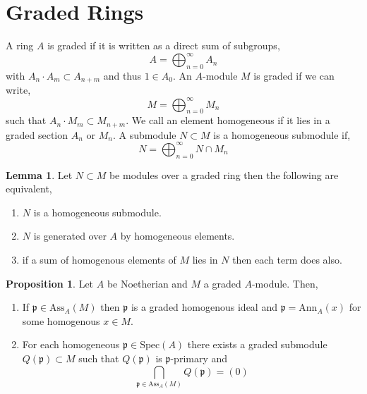 \documentclass[12pt]{article}
\newcommand{\Ann}[2]{\mathrm{Ann}_{#1}\left(#2\right)}
\newcommand{\Ass}[2]{\mathrm{Ass}_{#1}\left( #2 \right)}
\newcommand{\spec}[1]{\mathrm{Spec}\left( #1 \right)}
\newcommand{\p}{\mathfrak{p}}
\theoremstyle{remark}
\theoremstyle{definition}
\newtheorem{lemma}[theorem]{Lemma}
\newtheorem{proposition}[theorem]{Proposition}
\newenvironment{definition}[1][Definition:]{\begin{trivlist}
\item[\hskip \labelsep {\bfseries #1}]}{\end{trivlist}}
\begin{document}
\section{Graded Rings}

\begin{definition}
A ring $A$ is graded if it is written as a direct sum of subgroups,
\[ A = \bigoplus_{n = 0}^\infty A_n \]
with $A_n \cdot A_m \subset A_{n + m}$ and thus $1 \in A_0$. An $A$-module $M$ is graded if we can write,
\[ M = \bigoplus_{n = 0}^\infty M_n \]
such that $A_n \cdot M_m \subset M_{n + m}$. We call an element homogeneous if it lies in a graded section $A_n$ or $M_n$. A submodule $N \subset M$ is a homogeneous submodule if,
\[ N = \bigoplus_{n = 0}^\infty N \cap M_n \]
\end{definition}

\begin{lemma}
Let $N \subset M$ be modules over a graded ring then the following are equivalent,
\begin{enumerate}
\item $N$ is a homogeneous submodule.
\item $N$ is generated over $A$ by homogeneous elements.
\item if a sum of homogenous elements of $M$ lies in $N$ then each term does also. 
\end{enumerate}
\end{lemma}

\begin{proposition}
Let $A$ be Noetherian and $M$ a graded $A$-module. Then,
\begin{enumerate}
\item If $\p \in \Ass{A}{M}$ then $\p$ is a graded homogenous ideal and $\p = \Ann{A}{x}$ for some homogenous $x \in M$.
\item For each homogeneous $\p \in \spec{A}$ there exists a graded submodule $Q(\p) \subset M$ such that $Q(\p)$ is $\p$-primary and
\[ \bigcap_{\p \in \Ass{A}{M}} Q(\p) = (0) \]
\end{enumerate}
\end{proposition}
\end{document}
